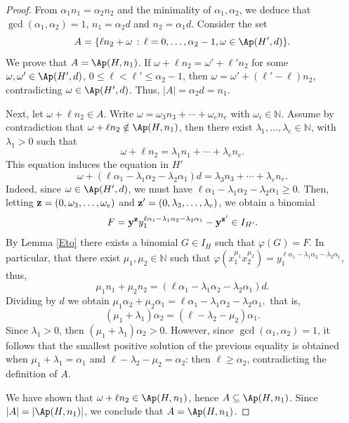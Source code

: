 \documentclass[11pt,twoside]{amsart}
\newcommand{\N}{\mathbb N}
\theoremstyle{definition}
\numberwithin{equation}{section}
\begin{document}
\begin{proof}
From $\alpha_1n_1=\alpha_2n_2$ and the minimality of $\alpha_1,\alpha_2$, we deduce that $\gcd(\alpha_1,\alpha_2)=1$, $n_1=\alpha_2d$ and $n_2=\alpha_1d$. Consider the set
$$	A=\{\ell n_2 +\omega \,: \, \ell = 0, \ldots, \alpha_2-1, \omega \in \Ap(H', d)\}.$$
We prove that $A=\Ap(H,n_1)$.  
If $\omega + \ell n_2 = \omega'+\ell' n_2$ for some $\omega,\omega' \in \Ap(H',d)$,  $0 \le \ell <\ell' \le \alpha_2-1$, then $\omega = \omega'+(\ell'-\ell)n_2$, contradicting $\omega \in \Ap(H',d)$. 
Thus, $|A|=\alpha_2d = n_1$.

Next, let $\omega + \ell n_2 \in A$. 
Write $\omega=\omega_3n_3+\cdots+\omega_en_e$ with $\omega_i \in \N$.
Assume by contradiction that $\omega + \ell n_2 \notin \Ap(H,n_1)$, then there exist $\lambda_1,\ldots,\lambda_e \in \N$, with $\lambda_1 > 0$ such that 
$$\omega+\ell n_2 = \lambda_1n_1+\cdots+\lambda_en_e.$$
This equation induces the equation in $H'$ 
$$\omega  +(\ell \alpha_1-\lambda_1\alpha_2-\lambda_2\alpha_1)d = \lambda_3n_3+\cdots+\lambda_en_e.$$
Indeed,
since $\omega \in \Ap(H',d)$, we must have $\ell \alpha_1 -\lambda_1 \alpha_2 - \lambda_2 \alpha_1 \ge 0$. 
Then, letting ${\bf z}=(0,\omega_3,\ldots,\omega_e)$ and ${\bf z}'=(0,\lambda_3,\ldots,\lambda_e)$, we obtain a binomial 
$$
F={\bf y}^{\bf z}y_1^{\ell \alpha_1-\lambda_1\alpha_2-\lambda_2\alpha_1}-{\bf y}^{\bf z'} \in I_{H'}.
$$
By Lemma \ref{Eto}  there exists a binomial $G \in I_H$ such that $\varphi(G)=F$. 
In particular,  that there exist $\mu_1,\mu_2 \in \N$ such that $\varphi(x_1^{\mu_1}x_2^{\mu_2})=y_1^{\ell \alpha_1-\lambda_1\alpha_2-\lambda_2\alpha_1}$,
thus,
$$\mu_1n_1+\mu_2n_2 = (\ell \alpha_1-\lambda_1\alpha_2-\lambda_2\alpha_1)d.$$
Dividing by $d$ we obtain  $\mu_1\alpha_2 + \mu_2 \alpha_1 = \ell \alpha_1-\lambda_1\alpha_2-\lambda_2\alpha_1,$
that is,
$$(\mu_1+\lambda_1)\alpha_2 = (\ell-\lambda_2-\mu_2)\alpha_1.$$
Since $\lambda_1 > 0$, then $(\mu_1+\lambda_1)\alpha_2 > 0$. 
However, since $\gcd(\alpha_1,\alpha_2)=1$, it follows that the smallest positive solution of the previous equality is obtained when $\mu_1+\lambda_1=\alpha_1$ and $\ell-\lambda_2-\mu_2 = \alpha_2$: then $\ell \ge \alpha_2$, contradicting the definition of $A$. 

We have shown that  $\omega + \ell n_2 \in \Ap(H,n_1)$, hence $A \subseteq \Ap(H,n_1)$. 
Since $|A|=|\Ap(H,n_1)|$, we conclude  that $A = \Ap(H,n_1)$.
\end{proof}
\end{document}
